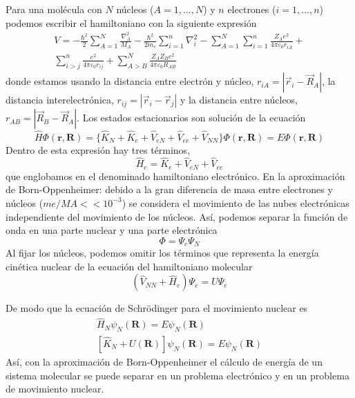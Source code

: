 Para una molécula con $N$ núcleos ($A=1,...,N$) y $n$ electrones ($i=1,...,n$)
podemos escribir el hamiltoniano con la siguiente expresión
\begin{equation}
 \begin{split}  
    V= -\frac{\hbar^2}{2}\sum_{A=1}^N\frac{\nabla^2_A}{M_A} 
    -\frac{\hbar^2}{2m_e}\sum_{i=1}^n
    \nabla^2_i 
    -\sum_{A=1}^N\sum_{i=1}^{n}\frac{Z_Ae^2}{4\pi \varepsilon_0r_{iA}} 
    +\\\sum_{i>j}^n \frac{e^2}{4\pi\varepsilon_0r_{ij}} 
    +\sum_{A>B}^N\frac{Z_AZ_Be^2}{4\pi \varepsilon_0R_{AB}} 
\end{split}
\end{equation}
donde estamos usando la distancia
entre electrón y núcleo, $r_{iA}=|\vec{r}_i-\vec{R}_A|$, la
distancia interelectrónica, $r_{ij}=|\vec{r}_i-\vec{r}_j|$ y la
distancia entre núcleos, $r_{AB}=|\vec{R}_B-\vec{R}_A|$.
Los estados estacionarios son solución de la
ecuación
\begin{equation}
    \hat{H}\Phi(\mathbf{r},\mathbf{R}) = \{
    \hat{K}_N + \hat{K}_e 
    +\hat{V}_{eN} 
    +\hat{V}_{ee}
    +\hat{V}_{NN} 
    \}\Phi(\mathbf{r},\mathbf{R}) = E\Phi(\mathbf{r},\mathbf{R})
\end{equation}
Dentro de esta expresión hay tres términos, 
\begin{equation}
    \hat{H}_e=\hat{K}_e 
    +\hat{V}_{eN} 
    +\hat{V}_{ee}
\end{equation}
que englobamos en el denominado hamiltoniano electrónico. En la
aproximación de Born-Oppenheimer:
debido a la gran diferencia de masa
entre electrones y núcleos ($me/MA << 10^{-3}$) se considera el movimiento 
de las nubes electrónicas 
independiente del movimiento de los 
núcleos. Así, podemos separar la
función de onda en una parte nuclear
y una parte electrónica
\begin{equation}
    \Phi=\Psi_e\Psi_N
\end{equation}
Al fijar los núcleos, podemos omitir
los términos que representa la energía
cinética nuclear de la ecuación
del hamiltoniano molecular
\begin{equation}
    (\hat{V}_{NN}+\hat{H}_{e})\Psi_e = 
    U\Psi_e
\end{equation}

De modo que la ecuación de Schrödinger para el movimiento nuclear es
\begin{align}
    \hat{H}_N\psi_N(\mathbf{R})=E\psi_N(\mathbf{R})\\
    [\hat{K}_N + U(\mathbf{R})]\psi_N(\mathbf{R}) = E\psi_N(\mathbf{R})
\end{align}
Así, con la aproximación de Born-Oppenheimer el cálculo de energía de un sistema molecular se puede separar en un problema electrónico y en un problema de movimiento nuclear.

